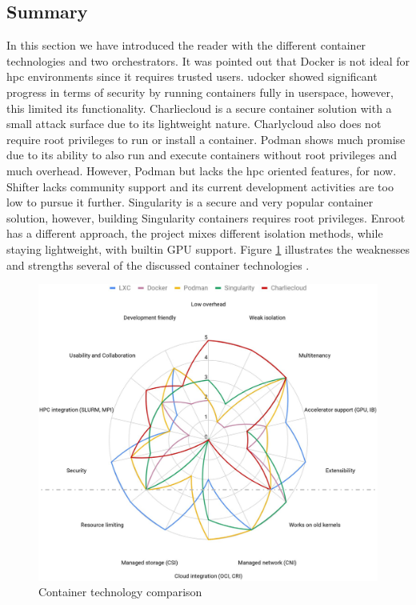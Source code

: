 \documentclass[conference]{IEEEtran}
\begin{document}
\subsection{Summary}
In this section we have introduced the reader with the different container technologies and two orchestrators. It was pointed out that Docker is not ideal for \gls{hpc} environments since it requires trusted users. udocker showed significant progress in terms of security by running containers fully in userspace, however, this limited its functionality. Charliecloud is a secure container solution with a small attack surface due to its lightweight nature. Charlycloud also does not require root privileges to run or install a container. Podman shows much promise due to its ability to also run and execute containers without root privileges and much overhead. However, Podman but lacks the \gls{hpc} oriented features, for now. Shifter lacks community support and its current development activities are too low to pursue it further. Singularity is a secure and very popular container solution, however, building Singularity containers requires root privileges. Enroot has a different approach, the project mixes different isolation methods, while staying lightweight, with builtin GPU support. Figure \ref{fig:container-tech} illustrates the weaknesses and strengths several of the discussed container technologies \cite{nvidia-slurm-containers}.

\begin{figure}[H]
\centering
\includegraphics[width=\columnwidth]{images/container_tech.png}
\caption{Container technology comparison}
\label{fig:container-tech}
\end{figure}
\end{document}
